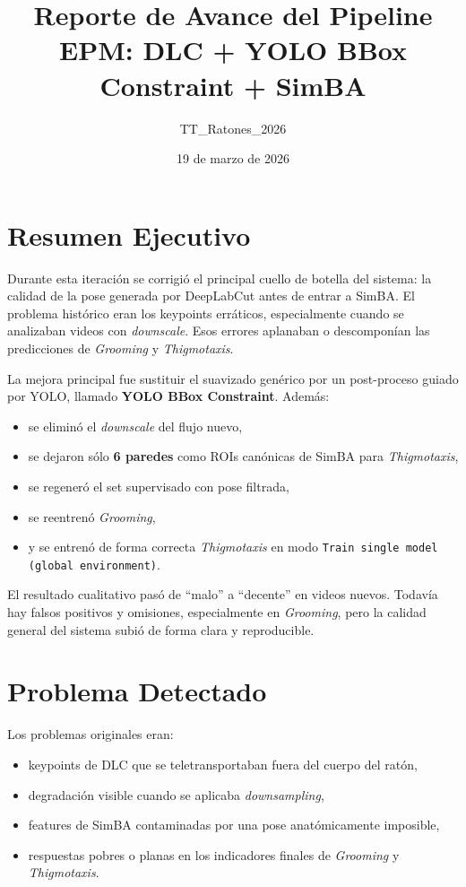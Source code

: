 \documentclass[12pt,a4paper]{article}
\title{\textbf{Reporte de Avance del Pipeline EPM: DLC + YOLO BBox Constraint + SimBA}}
\author{TT\_Ratones\_2026}
\date{19 de marzo de 2026}
\begin{document}
\maketitle

\section{Resumen Ejecutivo}
Durante esta iteraci\'on se corrigi\'o el principal cuello de botella del sistema: la calidad de la pose generada por DeepLabCut antes de entrar a SimBA. El problema hist\'orico eran los keypoints err\'aticos, especialmente cuando se analizaban videos con \textit{downscale}. Esos errores aplanaban o descompon\'ian las predicciones de \textit{Grooming} y \textit{Thigmotaxis}.

La mejora principal fue sustituir el suavizado gen\'erico por un post-proceso guiado por YOLO, llamado \textbf{YOLO BBox Constraint}. Adem\'as:
\begin{itemize}[leftmargin=1.5cm]
    \item se elimin\'o el \textit{downscale} del flujo nuevo,
    \item se dejaron s\'olo \textbf{6 paredes} como ROIs can\'onicas de SimBA para \textit{Thigmotaxis},
    \item se regener\'o el set supervisado con pose filtrada,
    \item se reentren\'o \textit{Grooming},
    \item y se entren\'o de forma correcta \textit{Thigmotaxis} en modo \texttt{Train single model (global environment)}.
\end{itemize}

El resultado cualitativo pas\'o de ``malo'' a ``decente'' en videos nuevos. Todav\'ia hay falsos positivos y omisiones, especialmente en \textit{Grooming}, pero la calidad general del sistema subi\'o de forma clara y reproducible.

\section{Problema Detectado}
Los problemas originales eran:
\begin{itemize}[leftmargin=1.5cm]
    \item keypoints de DLC que se teletransportaban fuera del cuerpo del rat\'on,
    \item degradaci\'on visible cuando se aplicaba \textit{downsampling},
    \item features de SimBA contaminadas por una pose anat\'omicamente imposible,
    \item respuestas pobres o planas en los indicadores finales de \textit{Grooming} y \textit{Thigmotaxis}.
\end{itemize}
\end{document}
